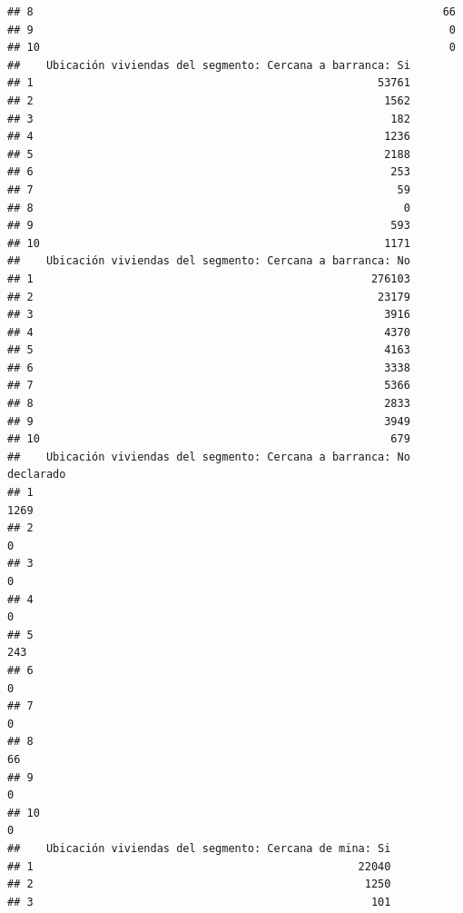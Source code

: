 \documentclass[11pt,]{article}
\begin{document}
\begin{verbatim}
## 8                                                               66
## 9                                                                0
## 10                                                               0
##    Ubicación viviendas del segmento: Cercana a barranca: Si
## 1                                                     53761
## 2                                                      1562
## 3                                                       182
## 4                                                      1236
## 5                                                      2188
## 6                                                       253
## 7                                                        59
## 8                                                         0
## 9                                                       593
## 10                                                     1171
##    Ubicación viviendas del segmento: Cercana a barranca: No
## 1                                                    276103
## 2                                                     23179
## 3                                                      3916
## 4                                                      4370
## 5                                                      4163
## 6                                                      3338
## 7                                                      5366
## 8                                                      2833
## 9                                                      3949
## 10                                                      679
##    Ubicación viviendas del segmento: Cercana a barranca: No declarado
## 1                                                                1269
## 2                                                                   0
## 3                                                                   0
## 4                                                                   0
## 5                                                                 243
## 6                                                                   0
## 7                                                                   0
## 8                                                                  66
## 9                                                                   0
## 10                                                                  0
##    Ubicación viviendas del segmento: Cercana de mina: Si
## 1                                                  22040
## 2                                                   1250
## 3                                                    101

\end{verbatim}
\end{document}
